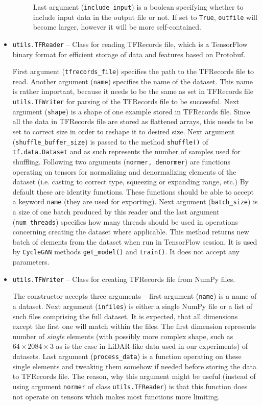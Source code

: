 \begin{itemize}
\begin{description}
Last argument (\texttt{include\_input}) is a boolean specifying whether to include input data in the output file or not. If set to \texttt{True}, \texttt{outfile} will become larger, however it will be more self-contained.
\end{description}
\item \texttt{utils.TFReader} -- Class for reading TFRecords file, which is a TensorFlow binary format for efficient storage of data and features based on Protobuf.
\begin{description}
 First argument (\texttt{tfrecords\_file}) specifies the path to the TFRecords file to read. Another argument (\texttt{name}) specifies the name of the dataset. This name is rather important, because it needs to be the same as set in TFRecords file \texttt{utils.TFWriter} for parsing of the TFRecords file to be successful. Next argument (\texttt{shape}) is a shape of one example stored in TFRecords file. Since all the data in TFRecords file are stored as flattened arrays, this needs to be set to correct size in order to reshape it to desired size. Next argument (\texttt{shuffle\_buffer\_size}) is passed to the method \texttt{shuffle()} of \texttt{tf.data.Dataset} and as such represents the number of samples used for shuffling. Following two arguments (\texttt{normer, denormer}) are functions operating on tensors for normalizing and denormalizing elements of the dataset (i.e. casting to correct type, squeezing or expanding range, etc.) By default these are identity functions. These functions should be able to accept a keyword \texttt{name} (they are used for exporting). Next argument (\texttt{batch\_size}) is a size of one batch produced by this reader and the last argument (\texttt{num\_threads}) specifies how many threads should be used in operations concerning creating the dataset where applicable.
 This method returns new batch of elements from the dataset when run in TensorFlow session. It is used by \texttt{CycleGAN} methods \texttt{get\_model()} and \texttt{train()}. It does not accept any parameters.
\end{description}
\item \texttt{utils.TFWriter} -- Class for creating TFRecords file from NumPy files.
\begin{description}
 The constructor accepts three arguments -- first argument (\texttt{name}) is a name of a dataset. Next argument (\texttt{infiles}) is either a single NumPy file or a list of such files comprising the full dataset. It is expected, that all dimensions except the first one will match within the files. The first dimension represents number of {\em single} elements (with possibly more complex shape, such as $64\times2084\times3$ as is the case in LiDAR-like data used in our experiments) of datasets. Last argument (\texttt{process\_data}) is a function operating on these single elements and tweaking them somehow if needed before storing the data to TFRecords file. The reason, why this argument might be useful (instead of using argument \texttt{normer} of class \texttt{utils.TFReader}) is that this function does not operate on tensors which makes most functions more limiting.

\end{description}
\end{itemize}
